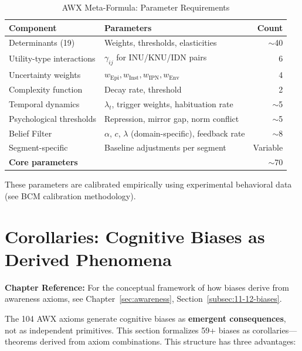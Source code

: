 \begin{table}[htbp]
\centering
\caption{AWX Meta-Formula: Parameter Requirements}
\label{tab:parameter-count}
\begin{tabular}{llr}
\toprule
\textbf{Component} & \textbf{Parameters} & \textbf{Count} \\
\midrule
Determinants (19) & Weights, thresholds, elasticities & $\sim$40 \\
Utility-type interactions & $\gamma_{ij}$ for INU/KNU/IDN pairs & 6 \\
Uncertainty weights & $w_{\text{Epi}}, w_{\text{Inst}}, w_{\text{IPN}}, w_{\text{Env}}$ & 4 \\
Complexity function & Decay rate, threshold & 2 \\
Temporal dynamics & $\lambda_t$, trigger weights, habituation rate & $\sim$5 \\
Psychological thresholds & Repression, mirror gap, norm conflict & $\sim$5 \\
Belief Filter & $\alpha$, $c$, $\lambda$ (domain-specific), feedback rate & $\sim$8 \\
Segment-specific & Baseline adjustments per segment & Variable \\
\midrule
\textbf{Core parameters} & & $\sim$70 \\
\bottomrule
\end{tabular}
\end{table}

These parameters are calibrated empirically using experimental behavioral data (see BCM calibration methodology).



\section{Corollaries: Cognitive Biases as Derived Phenomena}
\label{sec:corollaries}

\begin{cross-reference}
\textbf{Chapter Reference:} For the conceptual framework of how biases derive 
from awareness axioms, see Chapter~\ref{sec:awareness}, 
Section~\ref{subsec:11-12-biases}.
\end{cross-reference}

The 104 AWX axioms generate cognitive biases as \textbf{emergent consequences}, not as independent primitives. This section formalizes 59+ biases as corollaries---theorems derived from axiom combinations. This structure has three advantages:

